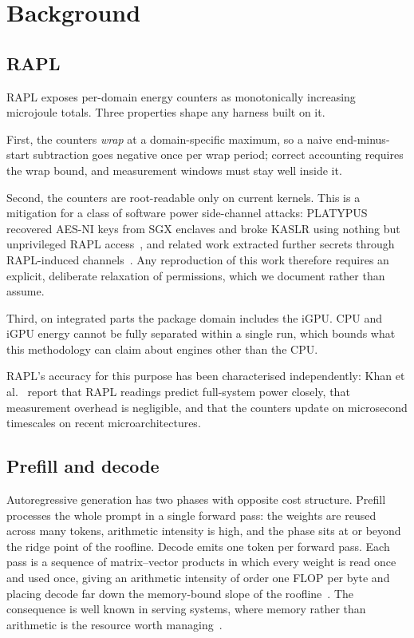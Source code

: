 \documentclass[journal]{IEEEtran}
\begin{document}
\section{Background}
\label{sec:background}

\subsection{RAPL}
RAPL exposes per-domain energy counters as monotonically increasing microjoule
totals. Three properties shape any harness built on it.

First, the counters \emph{wrap} at a domain-specific maximum, so a naive
end-minus-start subtraction goes negative once per wrap period; correct
accounting requires the wrap bound, and measurement windows must stay well
inside it.

Second, the counters are root-readable only on current kernels. This is a
mitigation for a class of software power side-channel attacks: PLATYPUS
recovered AES-NI keys from SGX enclaves and broke KASLR using nothing but
unprivileged RAPL access~\cite{lipp2021platypus}, and related work extracted
further secrets through RAPL-induced channels~\cite{zhang2021redalert}. Any
reproduction of this work therefore requires an explicit, deliberate
relaxation of permissions, which we document rather than assume.

Third, on integrated parts the package domain includes the iGPU. CPU and iGPU
energy cannot be fully separated within a single run, which bounds what this
methodology can claim about engines other than the CPU.

RAPL's accuracy for this purpose has been characterised independently: Khan
et al.~\cite{khan2018rapl} report that RAPL readings predict full-system power
closely, that measurement overhead is negligible, and that the counters update
on microsecond timescales on recent microarchitectures.

\subsection{Prefill and decode}
\label{sec:phases}
Autoregressive generation has two phases with opposite cost structure. Prefill
processes the whole prompt in a single forward pass: the weights are reused
across many tokens, arithmetic intensity is high, and the phase sits at or
beyond the ridge point of the roofline. Decode emits one token per forward
pass. Each pass is a sequence of matrix--vector products in which every weight
is read once and used once, giving an arithmetic intensity of order one FLOP
per byte and placing decode far down the memory-bound slope of the
roofline~\cite{yuan2024roofline}. The consequence is well known in serving
systems, where memory rather than arithmetic is the resource worth
managing~\cite{kwon2023pagedattention}.
\end{document}
